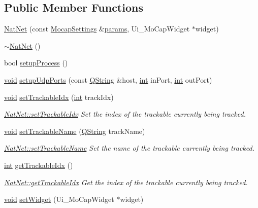\subsection*{Public Member Functions}
\begin{DoxyCompactItemize}
\item 
\hyperlink{group__mocap_gaa94c0d1f5d60294b81cdb7d04f50c13e}{Nat\-Net} (const \hyperlink{group___mo_cap_plugin_ga6083347a5b3eb70e360f599354dc0f0b}{Mocap\-Settings} \&\hyperlink{glext_8h_afeb6390ab3bc8a0e96a88aff34d52288}{params}, Ui\-\_\-\-Mo\-Cap\-Widget $\ast$widget)
\item 
\hyperlink{group__mocap_ga119cde1cc51a6b41f0e064565467c398}{$\sim$\-Nat\-Net} ()
\item 
bool \hyperlink{group__mocap_gaec62d88408f6c898d9cd6b6192b7dec8}{setup\-Process} ()
\item 
\hyperlink{group___u_a_v_objects_plugin_ga444cf2ff3f0ecbe028adce838d373f5c}{void} \hyperlink{group__mocap_gad51f36a3cda11c275da178b2e55ae688}{setup\-Udp\-Ports} (const \hyperlink{group___u_a_v_objects_plugin_gab9d252f49c333c94a72f97ce3105a32d}{Q\-String} \&host, \hyperlink{ioapi_8h_a787fa3cf048117ba7123753c1e74fcd6}{int} in\-Port, \hyperlink{ioapi_8h_a787fa3cf048117ba7123753c1e74fcd6}{int} out\-Port)
\item 
\hyperlink{group___u_a_v_objects_plugin_ga444cf2ff3f0ecbe028adce838d373f5c}{void} \hyperlink{group__mocap_ga92f0c84eeffa49fd021a9c5ad837947a}{set\-Trackable\-Idx} (\hyperlink{ioapi_8h_a787fa3cf048117ba7123753c1e74fcd6}{int} track\-Idx)
\begin{DoxyCompactList}\small\item\em \hyperlink{group__mocap_ga92f0c84eeffa49fd021a9c5ad837947a}{Nat\-Net\-::set\-Trackable\-Idx} Set the index of the trackable currently being tracked. \end{DoxyCompactList}\item 
\hyperlink{group___u_a_v_objects_plugin_ga444cf2ff3f0ecbe028adce838d373f5c}{void} \hyperlink{group__mocap_gac1813312de25d16f42e41c5ffd3ced8c}{set\-Trackable\-Name} (\hyperlink{group___u_a_v_objects_plugin_gab9d252f49c333c94a72f97ce3105a32d}{Q\-String} track\-Name)
\begin{DoxyCompactList}\small\item\em \hyperlink{group__mocap_gac1813312de25d16f42e41c5ffd3ced8c}{Nat\-Net\-::set\-Trackable\-Name} Set the name of the trackable currently being tracked. \end{DoxyCompactList}\item 
\hyperlink{ioapi_8h_a787fa3cf048117ba7123753c1e74fcd6}{int} \hyperlink{group__mocap_gabf29127f9bdc7e4667b0d495812ec2a0}{get\-Trackable\-Idx} ()
\begin{DoxyCompactList}\small\item\em \hyperlink{group__mocap_gabf29127f9bdc7e4667b0d495812ec2a0}{Nat\-Net\-::get\-Trackable\-Idx} Get the index of the trackable currently being tracked. \end{DoxyCompactList}\item 
\hyperlink{group___u_a_v_objects_plugin_ga444cf2ff3f0ecbe028adce838d373f5c}{void} \hyperlink{group__mocap_ga5c9af1ea346e9baf803728c2e0f94dc8}{set\-Widget} (Ui\-\_\-\-Mo\-Cap\-Widget $\ast$widget)
\end{DoxyCompactItemize}
